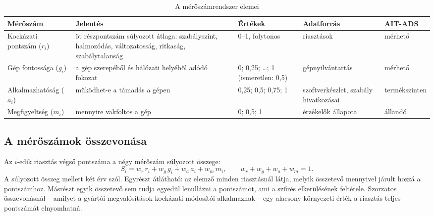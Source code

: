\begin{table}[H]
    \centering
    \caption{A mérőszámrendszer elemei}
    \label{tab:metrikak}
    \small
    \begin{tabular}{|L{2.4cm}|L{3.4cm}|L{2.4cm}|L{2.7cm}|L{1.9cm}|}
        \hline
        \textbf{Mérőszám} & \textbf{Jelentés} & \textbf{Értékek} & \textbf{Adatforrás} & \textbf{AIT-ADS} \\ \hline
        Kockázati pontszám ($r_i$) & öt részpontszám súlyozott átlaga: szabályszint, halmozódás, változatosság, ritkaság, szabálytalanság & 0--1, folytonos & riasztások & mérhető \\ \hline
        Gép fontossága ($g_i$) & a gép szerepéből és hálózati helyéből adódó fokozat & 0; 0,25; \ldots; 1 (ismeretlen: 0,5) & gépnyilvántartás & mérhető \\ \hline
        Alkalmaz\-hatóság ($a_i$) & működhet-e a támadás a gépen & 0,25; 0,5; 0,75; 1 & szoftverkészlet, szabály hivatkozásai & termék\-szinten \\ \hline
        Megfigyeltség ($m_i$) & mennyire vakfoltos a gép & 0; 0,5; 1 & érzékelők állapota & állandó \\ \hline
    \end{tabular}
\end{table}

\subsection{A mérőszámok összevonása}\label{sec:osszevonas}

Az $i$-edik riasztás végső pontszáma a négy mérőszám súlyozott összege:
\begin{equation}
    S_i = w_r\, r_i + w_g\, g_i + w_a\, a_i + w_m\, m_i, \qquad w_r + w_g + w_a + w_m = 1 .
    \label{eq:pontszam}
\end{equation}
A súlyozott összeg mellett két érv szól. Egyrészt átlátható: az elemző minden riasztásnál látja, melyik összetevő mennyivel járult hozzá a pontszámhoz. Másrészt egyik összetevő sem tudja egyedül lenullázni a pontszámot, ami a szűrés elkerülésének feltétele. Szorzatos összevonásnál -- amilyet a gyártói megvalósítások kockázati módosítói alkalmaznak -- egy alacsony környezeti érték a riasztás teljes pontszámát elnyomhatná.

